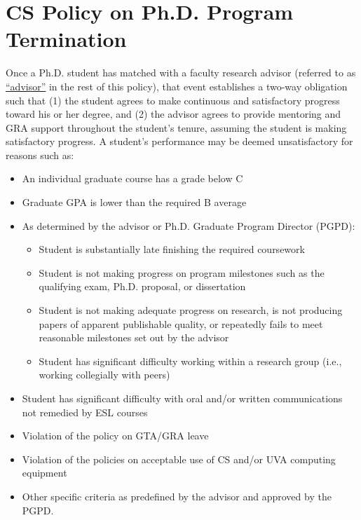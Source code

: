 \newpage
\hypertarget{appendix-c-cs-policy-on-defunding-a-gra}{%
\section{CS Policy on Ph.D. Program Termination}\label{appendix-c-cs-policy-on-defunding-a-gra}}

Once a Ph.D. student has matched with a faculty research advisor 
(referred to as \underline{``advisor''} in the rest of this policy), 
that event establishes a two-way obligation such that (1) the student agrees to
make continuous and satisfactory progress toward his or her degree, and
(2) the advisor agrees to provide mentoring and GRA support
throughout the student's tenure, 
assuming the student is making satisfactory progress. 
A student's performance may be deemed unsatisfactory for reasons such as:

\begin{itemize}
\item
  An individual graduate course has a grade below C
\item
  Graduate GPA is lower than the required B average
\item
  As determined by the advisor or Ph.D. Graduate Program Director (PGPD):

  \begin{itemize}
  \item
    Student is substantially late finishing the required coursework
  \item
    Student is not making progress on program milestones such as the
    qualifying exam, Ph.D. proposal, or dissertation
  \item
    Student is not making adequate progress on research, is not
    producing papers of apparent publishable quality, or repeatedly
    fails to meet reasonable milestones set out by the advisor
  \item
    Student has significant difficulty working within a research group
    (i.e., working collegially with peers)
  \end{itemize}
\item
  Student has significant difficulty with oral and/or written
  communications not remedied by ESL courses
\item
  Violation of the policy on GTA/GRA leave
\item
  Violation of the policies on acceptable use of CS and/or UVA computing
  equipment
\item
  Other specific criteria as predefined by the advisor and approved by
  the PGPD.
\end{itemize}

